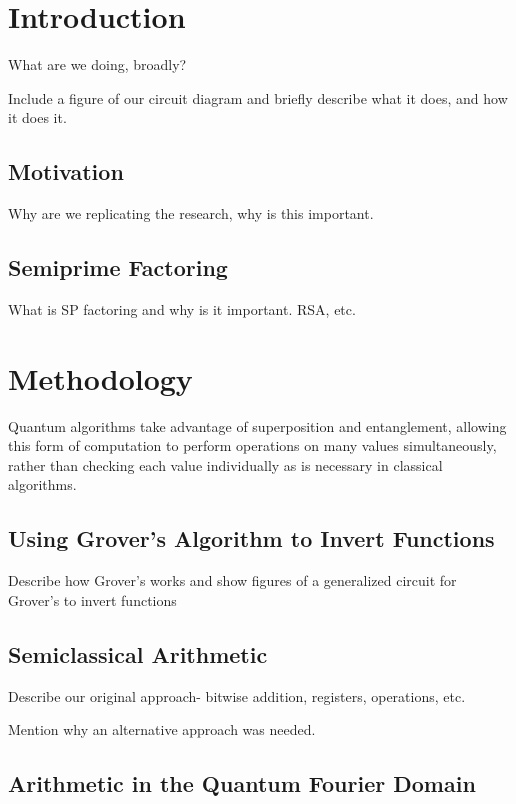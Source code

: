 \documentclass[twocolumn]{cinc}
\begin{document}
\section{Introduction}

What are we doing, broadly?

Include a figure of our circuit diagram and briefly describe what it 
does, and how it does it.

  \subsection{Motivation}

  Why are we replicating the research, why is this important.

  \subsection{Semiprime Factoring}  

  What is SP factoring and why is it important. RSA, etc.

\section{Methodology}
 
Quantum algorithms take advantage of superposition and entanglement,
allowing this form of computation to perform operations on many 
values simultaneously, rather than checking each value individually
as is necessary in classical algorithms.

  \subsection{Using Grover's Algorithm to Invert Functions} 

  Describe how Grover's works and show figures of a generalized
  circuit for Grover's to invert functions

  \subsection{Semiclassical Arithmetic} 

  Describe our original approach- bitwise addition, registers, operations, etc.

  Mention why an alternative approach was needed.

  \subsection{Arithmetic in the Quantum Fourier Domain}  
\end{document}
